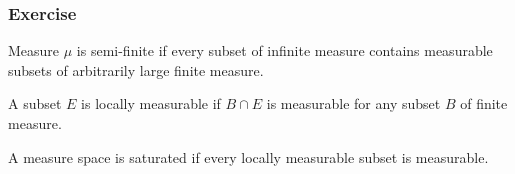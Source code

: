 \subsubsection{Exercise}
\begin{definition}
	Measure $\mu$ is semi-finite if every subset of infinite measure contains measurable subsets of arbitrarily large finite measure.
\end{definition}
\begin{definition}
	A subset $E$ is locally measurable if $B \cap E$ is measurable for any subset $B$ of finite measure.
\end{definition}
\begin{definition}[saturated]
	A measure space is saturated if every locally measurable subset is measurable.
\end{definition}
